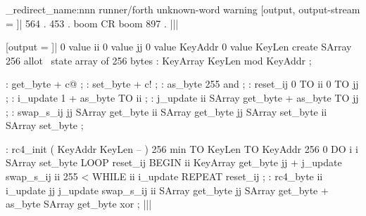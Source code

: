 {
  \ExplSyntaxOn
  \msg_redirect_name:nnn { runner/forth } { unknown-word } { warning }
  [output, output-stream = \z@]|
    564 . 453 . boom CR boom 897 .
  |||
}

\stop

[output = \result]|
  0 value ii        0 value jj
  0 value KeyAddr   0 value KeyLen
  create SArray   256 allot   \ state array of 256 bytes
  : KeyArray      KeyLen mod   KeyAddr ;

  : get_byte      + c@ ;
  : set_byte      + c! ;
  : as_byte       255 and ;
  : reset_ij      0 TO ii   0 TO jj ;
  : i_update      1 +   as_byte TO ii ;
  : j_update      ii SArray get_byte +   as_byte TO jj ;
  : swap_s_ij
      jj SArray get_byte
         ii SArray get_byte  jj SArray set_byte
      ii SArray set_byte
  ;

  : rc4_init ( KeyAddr KeyLen -- )
      256 min TO KeyLen   TO KeyAddr
      256 0 DO   i i SArray set_byte   LOOP
      reset_ij
      BEGIN
          ii KeyArray get_byte   jj +  j_update
          swap_s_ij
          ii 255 < WHILE
          ii i_update
      REPEAT
      reset_ij
  ;
  : rc4_byte
      ii i_update   jj j_update
      swap_s_ij
      ii SArray get_byte   jj SArray get_byte +   as_byte SArray get_byte  xor
  ;
|||
\typeout{\result}

\stop